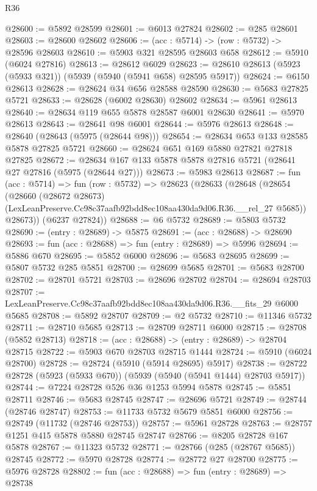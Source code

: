 \begin{lexlean}{R36}
\begin{coremodule}
@28600 := @5892 @28599
@28601 := @6013 @27824
@28602 := @285 @28601
@28603 := @28600 @28602
@28606 := (acc : @5714) -> (row : @5732) -> @28596 @28603
@28610 := @5903 @321 @28595 @28603 @658
@28612 := @5910 (@6024 @27816)
@28613 := @28612 @6029
@28623 := @28610 @28613 (@5923 (@5933 @321)) (@5939 (@5940 (@5941 @658) @28595 @5917))
@28624 := @6150 @28613
@28628 := @28624 @34 @656 @28588 @28590
@28630 := @5683 @27825 @5721
@28633 := @28628 (@6002 @28630) @28602
@28634 := @5961 @28613
@28640 := @28634 @119 @655 @5878 @28587 @6001 @28630
@28641 := @5970 @28613
@28643 := @28641 @98 @6001
@28644 := @5976 @28613
@28648 := @28640 (@28643 (@5975 (@28644 @98)))
@28654 := @28634 @653 @133 @28585 @5878 @27825 @5721
@28660 := @28624 @651 @169 @5880 @27821 @27818 @27825
@28672 := @28634 @167 @133 @5878 @5878 @27816 @5721 (@28641 @27 @27816 (@5975 (@28644 @27)))
@28673 := @5983 @28613
@28687 := fun (acc : @5714) =>
  fun (row : @5732) =>
  @28623
    (@28633
      (@28648
        (@28654
          (@28660
            (@28672 @28673)
            (LexLeanPreserve.Cc98c37aafb92bdd8ec108aa430da9d06.R36.__rel_27 @5685))
          @28673))
      (@6237 @27824))
@28688 := @6 @5732
@28689 := @5803 @5732
@28690 := (entry : @28689) -> @5875
@28691 := (acc : @28688) -> @28690
@28693 := fun (acc : @28688) => fun (entry : @28689) => @5996
@28694 := @5886 @670
@28695 := @5852 @6000
@28696 := @5683 @28695
@28699 := @5807 @5732 @285 @5851
@28700 := @28699 @5685
@28701 := @5683 @28700
@28702 := @28701 @5721
@28703 := @28696 @28702
@28704 := @28694 @28703
@28707 := LexLeanPreserve.Cc98c37aafb92bdd8ec108aa430da9d06.R36.__fits_29 @6000 @5685
@28708 := @5892 @28707
@28709 := @2 @5732
@28710 := @11346 @5732
@28711 := @28710 @5685
@28713 := @28709 @28711 @6000
@28715 := @28708 (@5852 @28713)
@28718 := (acc : @28688) -> (entry : @28689) -> @28704 @28715
@28722 := @5903 @670 @28703 @28715 @1444
@28724 := @5910 (@6024 @28700)
@28728 := @28724 (@5910 (@5914 @28695) @5917)
@28738 := @28722 @28728 (@5923 (@5933 @670)) (@5939 (@5940 (@5941 @1444) @28703 @5917))
@28744 := @7224 @28728 @526 @36 @1253 @5994 @5878
@28745 := @5851 @28711
@28746 := @5683 @28745
@28747 := @28696 @5721
@28749 := @28744 (@28746 @28747)
@28753 := @11733 @5732 @5679 @5851 @6000
@28756 := @28749 (@11732 (@28746 @28753))
@28757 := @5961 @28728
@28763 := @28757 @1251 @415 @5878 @5880 @28745 @28747
@28766 := @8205 @28728 @167 @5878
@28767 := @11323 @5732
@28771 := @28766 (@285 (@28767 @5685)) @28745
@28772 := @5970 @28728
@28774 := @28772 @27 @28700
@28775 := @5976 @28728
@28802 := fun (acc : @28688) =>
  fun (entry : @28689) =>
  @28738

\end{coremodule}
\end{lexlean}
